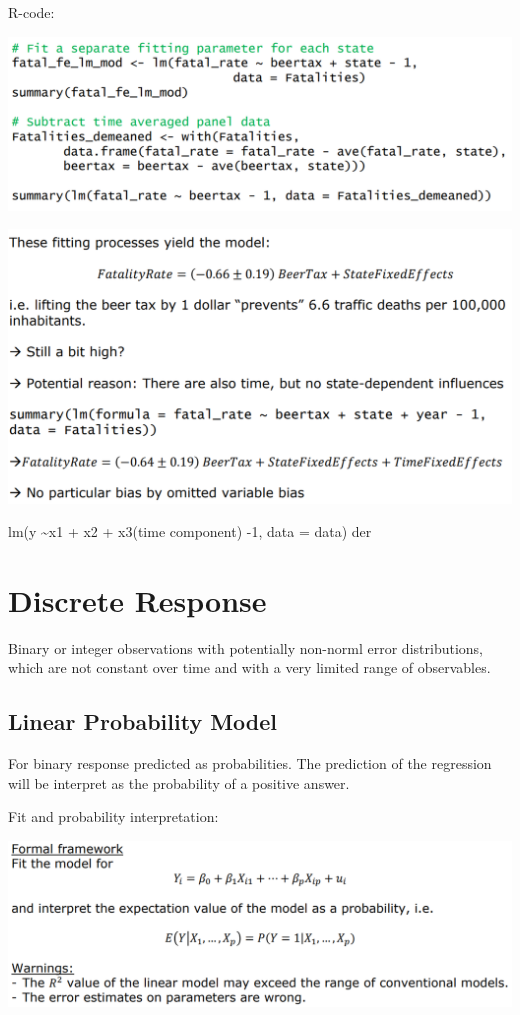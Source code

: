 \documentclass[
]{article}
\begin{document}
R-code:

\includegraphics[width=1\linewidth]{rcode}

\includegraphics[width=1\linewidth]{sol}

lm(y \textasciitilde x1 + x2 + x3(time component) -1, data = data) der

\hypertarget{discrete-response}{%
\section{Discrete Response}\label{discrete-response}}

Binary or integer observations with potentially non-norml error
distributions, which are not constant over time and with a very limited
range of observables.

\hypertarget{linear-probability-model}{%
\subsection{Linear Probability Model}\label{linear-probability-model}}

For binary response predicted as probabilities. The prediction of the
regression will be interpret as the probability of a positive answer.

Fit and probability interpretation:

\includegraphics[width=1\linewidth]{prob}
\end{document}
